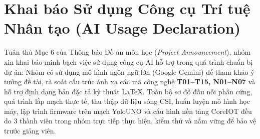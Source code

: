 \documentclass{hcmut-report}
\begin{document}
\section*{Khai báo Sử dụng Công cụ Trí tuệ Nhân tạo (AI Usage Declaration)}
Tuân thủ Mục 6 của Thông báo Đồ án môn học (\textit{Project Announcement}), nhóm xin khai báo minh bạch việc sử dụng công cụ AI hỗ trợ trong quá trình chuẩn bị dự án: Nhóm có sử dụng mô hình ngôn ngữ lớn (Google Gemini) để tham khảo ý tưởng đề tài, rà soát cấu trúc ánh xạ các mã công nghệ \textbf{T01--T15, N01--N07} và hỗ trợ định dạng bản đặc tả kỹ thuật LaTeX. Toàn bộ sơ đồ đấu nối phần cứng, quá trình lắp mạch thực tế, thu thập dữ liệu sóng CSI, huấn luyện mô hình học máy, lập trình firmware trên mạch YoloUNO và cấu hình nền tảng CoreIOT đều do 3 thành viên trong nhóm trực tiếp thực hiện, kiểm thử và nắm vững để bảo vệ trước giảng viên.
\end{document}
